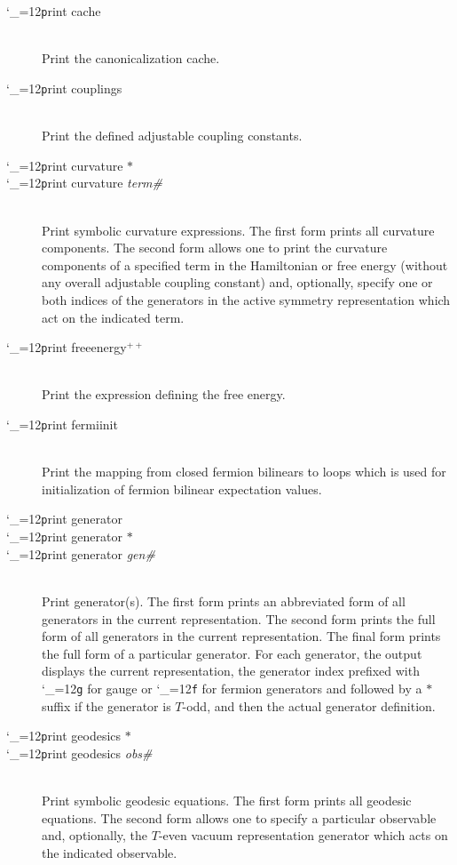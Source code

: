 \documentclass [12pt]{article}
\makeatletter
\renewcommand{\tt}{\begingroup\catcode`_=12\def\_{\string_}\tt@}
\newcommand{\tt@}[1]{\texttt{#1}\endgroup}
\makeatother
\begin{document}
\begin{description}
\item [\tt print cache]~\\
    Print the canonicalization cache.

\item [\tt print couplings]~\\
    Print the defined adjustable coupling constants.

\item [\tt print curvature $*$] \bgroup \itemsep 0pt \parskip 0pt
\item [\tt print curvature {\it term\#} {\tt{[}}{\it gen1\#}
    {\tt{[}}{\it gen2\#}{\tt{]}}{\tt{]}} ]~\\
    Print symbolic curvature expressions.
    The first form prints all curvature components.
    The second form allows one to print the curvature components
    of a specified term in the Hamiltonian or free energy
    (without any overall adjustable coupling constant)
    and, optionally, specify one or both
    indices of the generators in the active symmetry representation
    which act on the indicated term.
\egroup

\item [\tt print freeenergy$^{++}$]~\\
    Print the expression defining the free energy.

\item [\tt print fermiinit]~\\
    Print the mapping from closed fermion bilinears to loops which
    is used for initialization of fermion bilinear expectation values.

\item [\tt print generator] \bgroup \itemsep 0pt \parskip 0pt
\item [\tt print generator $*$]
\item [\tt print generator {\it gen\#}]~\\
    Print generator(s).
    The first form prints an abbreviated form of all generators in the
    current representation.
    The second form prints the full form of all generators in the
    current representation.
    The final form prints the full form of a particular generator.
    For each generator,
    the output displays the current representation, the generator index
    prefixed with \tt{g} for gauge or \tt{f} for fermion generators
    and followed by a $*$ suffix if the generator is $T$-odd,
    and then the actual generator definition.
\egroup

\item [\tt print geodesics $*$] \bgroup \itemsep 0pt \parskip 0pt
\item [\tt print geodesics {\it obs\#} {\tt{[}}{\it gen\#}{\tt{]}}]~\\
    Print symbolic geodesic equations.
    The first form prints all geodesic equations.
    The second form allows one to specify a particular observable
    and, optionally, the $T$-even vacuum representation generator
    which acts on the indicated observable.
\egroup


\end{description}
\end{document}
